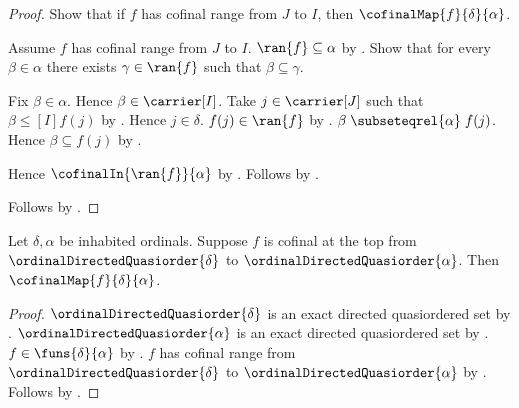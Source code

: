 \begin{proof}
    Show that if $f$ has cofinal range from $J$ to $I$, then
        $\cofinalMap{f}{\delta}{\alpha}$.
    \begin{subproof}
        Assume $f$ has cofinal range from $J$ to $I$.
        $\ran{f}\subseteq\alpha$ by .
        Show that for every $\beta\in\alpha$ there exists
            $\gamma\in\ran{f}$ such that $\beta\subseteq\gamma$.
        \begin{subproof}
            Fix $\beta\in\alpha$.
            Hence $\beta\in\carrier[I]$.
            Take $j\in\carrier[J]$ such that
                $\beta\mathrel{\leq[I]}f(j)$ by
                .
            Hence $j\in\delta$.
            $f(j)\in\ran{f}$ by .
            $\beta\mathrel{\subseteqrel{\alpha}}f(j)$.
            Hence $\beta\subseteq f(j)$ by .
        \end{subproof}
        Hence $\cofinalIn{\ran{f}}{\alpha}$ by .
        Follows by .
    \end{subproof}
    Follows by \auto.
\end{proof}

\begin{corollary}\label{ordinal_at_top_cofinal_implies_cofinal_map}
    Let $\delta,\alpha$ be inhabited ordinals.
    Suppose $f$ is cofinal at the top from
        $\ordinalDirectedQuasiorder{\delta}$ to
        $\ordinalDirectedQuasiorder{\alpha}$.
    Then $\cofinalMap{f}{\delta}{\alpha}$.
\end{corollary}
\begin{proof}
    $\ordinalDirectedQuasiorder{\delta}$ is an exact directed
        quasiordered set by
        .
    $\ordinalDirectedQuasiorder{\alpha}$ is an exact directed
        quasiordered set by
        .
    $f\in\funs{\delta}{\alpha}$ by
        .
    $f$ has cofinal range from
        $\ordinalDirectedQuasiorder{\delta}$ to
        $\ordinalDirectedQuasiorder{\alpha}$ by
        .
    Follows by .
\end{proof}


